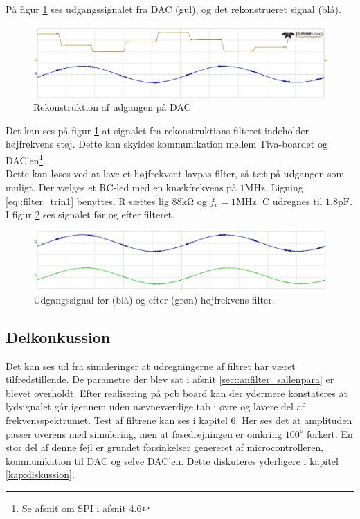 På figur \ref{fig::anfilter_recon} ses udgangssignalet fra DAC (gul), og det rekonstrueret signal (blå).
\begin{figure}[h!]
	\centering
	\includegraphics[scale = 0.4]{./billeder/reconstruction}
	\caption{Rekonstruktion af udgangen på DAC}
	\label{fig::anfilter_recon}
\end{figure}
\FloatBlock


Det kan ses på figur \ref{fig::anfilter_recon} at signalet fra rekonstruktions filteret indeholder højfrekvens støj. Dette kan skyldes kommunikation mellem Tiva-boardet og DAC'en\footnote{Se afsnit om SPI i afsnit 4.6}. \\
Dette kan løses ved at lave et højfrekvent lavpas filter, så tæt på udgangen som muligt. Der vælges et RC-led med en knækfrekvens på $1\si{\mega\hertz}$. Ligning \ref{eq::filter_trin1} benyttes, R sættes lig $88\si{\kilo\ohm}$ og $f_c = 1\si{\mega\hertz}$. C udregnes til $1.8\si{\pico\farad}$. I figur \ref{fig::anfilter_hf} ses signalet før og efter filteret.



\begin{figure}[h!]
	\centering
	\includegraphics[scale = 0.55]{./billeder/hf.png}
	\caption{Udgangssignal før (blå) og efter (grøn) højfrekvens filter.}
	\label{fig::anfilter_hf}
\end{figure}
\FloatBlock

\subsection{Delkonkussion}
Det kan ses ud fra simuleringer at udregningerne af filtret har været tilfredstillende. De parametre der blev sat i afsnit \ref{sec::anfilter_sallenpara} er blevet overholdt. Efter realisering på pcb board kan der  ydermere konstateres at lydsignalet går igennem uden nævneværdige tab i øvre og lavere del af frekvensspektrumet. Test af filtrene kan ses i kapitel 6. Her ses det at amplituden passer overens med simulering, men at fasedrejningen er omkring $100^o$ forkert. En stor del af denne fejl er grundet forsinkelser genereret af microcontrolleren, kommunikation til DAC og selve DAC'en. Dette diskuteres yderligere i kapitel \ref{kap:diskussion}.